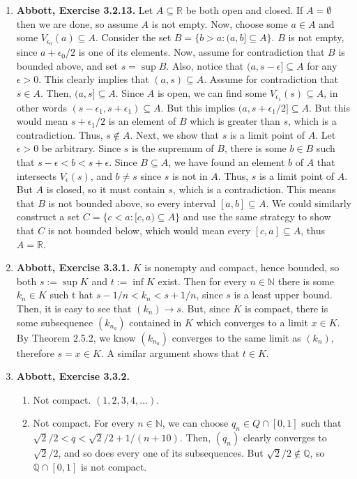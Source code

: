 \documentclass{article}
\newcommand{\N}{\mathbb{N}}
\newcommand{\Q}{\mathbb{Q}}
\newcommand{\R}{\mathbb{R}}
\newcommand{\ra}{\rightarrow}
\newcommand{\set}[1]{\{#1\}}
\newcommand{\exc}[2][Abbott]{\item \textbf{#1, Exercise #2.}}
\newcommand{\lep}[1][L]{#1et $\epsilon > 0$ be arbitrary}
\begin{document}
\begin{enumerate}
    \exc{3.2.13}
    Let $A \subseteq \R$ be both open and closed. If $A = \emptyset$ then we are done, so assume $A$ is not empty. Now, choose some $a \in A$ and some $V_{\epsilon_0}(a) \subseteq A$. Consider the set $B = \set{b > a: (a, b] \subseteq A}$. $B$ is not empty, since $a + \epsilon_0/2$ is one of its elements. Now, assume for contradiction that $B$ is bounded above, and set $s = \sup{B}$. Also, notice that $(a, s-\epsilon] \subseteq A$ for any $\epsilon > 0$. This clearly implies that $(a, s) \subseteq A$. Assume for contradiction that $s \in A$. Then, $(a,s] \subseteq A$. Since $A$ is open, we can find some $V_{\epsilon_1}(s) \subseteq A$, in other words $(s-\epsilon_1, s+\epsilon_1) \subseteq A$. But this implies $(a,s+\epsilon_1/2] \subseteq A$. But this would mean $s+\epsilon_1/2$ is an element of $B$ which is greater than $s$, which is a contradiction. Thus, $s \notin A$. Next, we show that $s$ is a limit point of $A$. \lep. Since $s$ is the supremum of $B$, there is some $b \in B$ such that $s-\epsilon < b < s+\epsilon$. Since $B \subseteq A$, we have found an element $b$ of $A$ that intersects $V_\epsilon(s)$, and $b \neq s$ since $s$ is not in $A$. Thus, $s$ is a limit point of $A$. But $A$ is closed, so it must contain $s$, which is a contradiction. This means that $B$ is not bounded above, so every interval $[a, b] \subseteq A$. We could similarly construct a set 
    $C = \set{c < a : [c, a) \subseteq A}$ and use the same strategy to show that $C$ is not bounded below, which would mean every $[c, a] \subseteq A$, thus $A = \R$. 
    
    \exc{3.3.1}
    $K$ is nonempty and compact, hence bounded, so both $s := \sup K$ and $t := \inf K$ exist. Then for every $n \in \N$ there is some $k_n \in K$ such t hat $s - 1/n < k_n < s+1/n$, since $s$ is a least upper bound. Then, it is easy to see that $(k_n) \ra s$. But, since $K$ is compact, there is some subsequence $(k_{n_a})$ contained in $K$ which converges to a limit $x \in K$. By Theorem 2.5.2, we know $(k_{n_a})$ converges to the same limit as $(k_n)$, therefore $s = x \in K$. A similar argument shows that $t \in K$.
    
    \exc{3.3.2}
    \begin{enumerate}
        \item Not compact. $(1, 2, 3, 4,\dots)$.
        
        \item Not compact. For every $n \in \N$, we can choose $q_n \in Q \cap [0, 1]$ such that $\sqrt{2}/2 < q < \sqrt{2}/2 + 1/(n+10)$. Then, $(q_n)$ clearly converges to $\sqrt{2}/2$, and so does every one of its subsequences. But $\sqrt{2}/2 \notin \Q$, so $\Q \cap [0, 1]$ is not compact.
        

\end{enumerate}
\end{enumerate}
\end{document}
